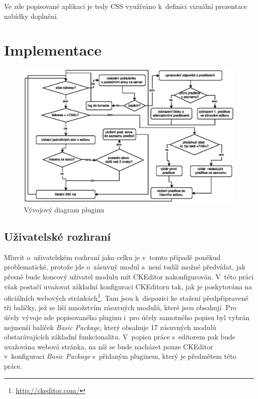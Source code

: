 \documentclass[a4paper,11pt,openany]{book} %
\begin{document}
Ve zde popisované aplikaci je tedy CSS využíváno k~definici vizuální prezentace nabídky doplnění.

\chapter{Implementace}

\begin{figure}[h]
	\centering
	\includegraphics[width=1.0\textwidth]{autocomplete_floatchart.eps}
	\caption{Vývojový diagram pluginu}
	\label{fig:autocomplete_floatchart}
\end{figure}

\section{Uživatelské rozhraní}\label{ui}

Mluvit o~uživatelském rozhraní jako celku je v~tomto případě poněkud problematické, protože jde o~zásuvný modul a~není tudíž možné předvídat, jak přesně bude koncový uživatel modulu mít CKEditor nakonfigurován. V~této práci však postačí uvažovat základní konfiguraci CKEditoru tak, jak je poskytována na oficiálních webových stránkách\footnote{\url{http://ckeditor.com/}}. Tam jsou k~dispozici ke stažení předpřipravené tři balíčky, jež se liší množstvím zásuvných modulů, které jsou obsahují. Pro účely vývoje zde popisovaného pluginu i~pro účely samotného popisu byl vybrán nejmenší balíček {\it Basic Package}, který obsahuje 17 zásuvných modulů obstarávajících základní funkcionalitu. V~popisu práce s~editorem pak bude uvažována webová stránka, na níž se bude nacházet pouze CKEditor v~konfiguraci {\it Basic Package} s~přidaným pluginem, který je předmětem této práce.
\end{document}
